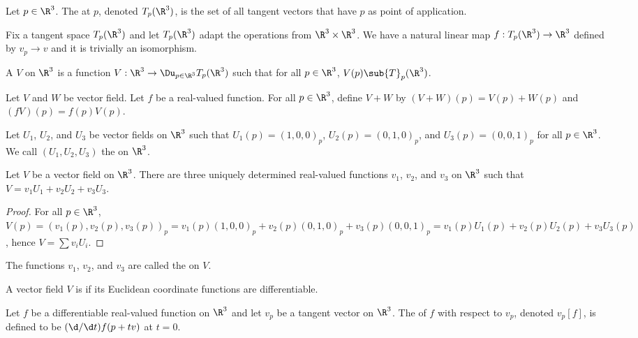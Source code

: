 \documentclass[10pt]{article}
\begin{document}
\begin{definition}
    Let $p\in{\R}^{3}$. The  at $p$, denoted ${T}_{p}({\R}^{3})$, is the set of all tangent vectors that have $p$ as point of application.
\end{definition}
\par
Fix a tangent space ${T}_{p}({\R}^{3})$ and let ${T}_{p}({\R}^{3})$ adapt the operations from ${\R}^{3}\times{\R}^{3}$. We have a natural linear map $f:{T}_{p}({\R}^{3})\to{\R}^{3}$ defined by ${v}_{p}\to v$ and it is trivially an isomorphism.
\begin{definition}
    A  $V$ on ${\R}^{3}$ is a function $V:{\R}^{3}\to{\Du}_{p\in{\R}^{3}}{T}_{p}({\R}^{3})$ such that for all $p\in{\R}^{3}$, $V(p)\sub{T}_{p}({\R}^{3})$.
\end{definition}
\par
Let $V$ and $W$ be vector field. Let $f$ be a real-valued function. For all $p\in{\R}^{3}$, define $V+W$ by $(V+W)(p)=V(p)+W(p)$ and $(fV)(p)=f(p)V(p)$.
\begin{definition}
    Let ${U}_{1}$, ${U}_{2}$, and ${U}_{3}$ be vector fields on ${\R}^{3}$ such that ${U}_{1}(p)={(1,0,0)}_{p}$, ${U}_{2}(p)={(0,1,0)}_{p}$, and ${U}_{3}(p)={(0,0,1)}_{p}$ for all $p\in{\R}^{3}$. We call $({U}_{1},{U}_{2},{U}_{3})$ the  on ${\R}^{3}$.
\end{definition}
\begin{proposition}
    Let $V$ be a vector field on ${\R}^{3}$. There are three uniquely determined real-valued functions ${v}_{1}$, ${v}_{2}$, and ${v}_{3}$ on ${\R}^{3}$ such that $V={v}_{1}{U}_{1}+{v}_{2}{U}_{2}+{v}_{3}{U}_{3}$.
\end{proposition}
\begin{proof}
    For all $p\in{\R}^{3}$, $V(p)={({v}_{1}(p),{v}_{2}(p),{v}_{3}(p))}_{p}={v}_{1}(p){(1,0,0)}_{p}+{v}_{2}(p){(0,1,0)}_{p}+{v}_{3}(p){(0,0,1)}_{p}={v}_{1}(p){U}_{1}(p)+{v}_{2}(p){U}_{2}(p)+{v}_{3}{U}_{3}(p)$, hence $V=\sum{v}_{i}{U}_{i}$.
\end{proof}
\par
The functions ${v}_{1}$, ${v}_{2}$, and ${v}_{3}$ are called the  on $V$.
\begin{definition}
    A vector field $V$ is  if its Euclidean coordinate functions are differentiable.
\end{definition}
\begin{definition}
    Let $f$ be a differentiable real-valued function on ${\R}^{3}$ and let ${v}_{p}$ be a tangent vector on ${\R}^{3}$. The  of $f$ with respect to ${v}_{p}$, denoted ${v}_{p}[f]$, is defined to be $(\d/\d t)f(p+tv)$ at $t=0$.
\end{definition}
\end{document}
